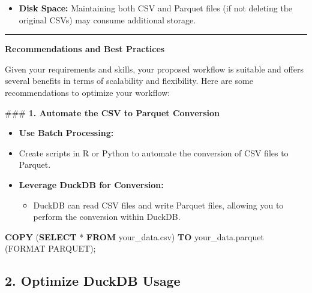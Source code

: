 \documentclass[
  american,
  10,
  a4paper,
]{book}
\newenvironment{Shaded}{\begin{snugshade}}{\end{snugshade}}
\newcommand{\KeywordTok}[1]{\textcolor[rgb]{0.00,0.23,0.31}{\textbf{#1}}}
\newcommand{\NormalTok}[1]{\textcolor[rgb]{0.00,0.23,0.31}{#1}}
\newcommand{\OperatorTok}[1]{\textcolor[rgb]{0.37,0.37,0.37}{#1}}
\newcommand{\StringTok}[1]{\textcolor[rgb]{0.13,0.47,0.30}{#1}}
\providecommand{\tightlist}{%
  \setlength{\itemsep}{0pt}\setlength{\parskip}{0pt}}
\theoremstyle{definition}
\theoremstyle{remark}
\begin{document}
\begin{itemize}
\tightlist
\item
  \textbf{Disk Space:} Maintaining both CSV and Parquet files (if not
  deleting the original CSVs) may consume additional storage.
\end{itemize}

\begin{center}\rule{0.5\linewidth}{0.5pt}\end{center}

\textbf{Recommendations and Best Practices}

Given your requirements and skills, your proposed workflow is suitable
and offers several benefits in terms of scalability and flexibility.
Here are some recommendations to optimize your workflow:

\#\#\# \textbf{1. Automate the CSV to Parquet Conversion}

\begin{itemize}
\item
  \textbf{Use Batch Processing:}
\item
  Create scripts in R or Python to automate the conversion of CSV files
  to Parquet.
\item
  \textbf{Leverage DuckDB for Conversion:}

  \begin{itemize}
  \tightlist
  \item
    DuckDB can read CSV files and write Parquet files, allowing you to
    perform the conversion within DuckDB.
  \end{itemize}
\end{itemize}

\begin{Shaded}
\begin{Highlighting}[]
\KeywordTok{COPY}\NormalTok{ (}\KeywordTok{SELECT} \OperatorTok{*} \KeywordTok{FROM} \StringTok{\textquotesingle{}your\_data.csv\textquotesingle{}}\NormalTok{) }\KeywordTok{TO} \StringTok{\textquotesingle{}your\_data.parquet\textquotesingle{}}\NormalTok{ (FORMAT PARQUET);}
\end{Highlighting}
\end{Shaded}

\subsection{\texorpdfstring{\textbf{2. Optimize DuckDB
Usage}}{2. Optimize DuckDB Usage}}\label{optimize-duckdb-usage}
\end{document}
